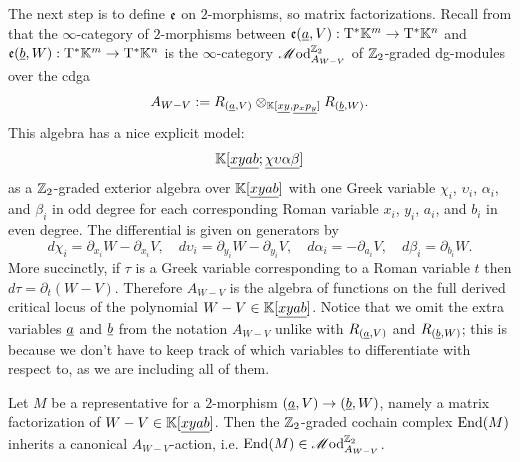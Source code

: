 The next step is to define $\mathfrak{e}$ on $2$-morphisms, so matrix factorizations. Recall from  that the $\infty$-category of $2$-morphisms between $\mathfrak{e}(\underline{a}, V) : \mathrm{T}^\ast \mathbb{K}^m \to \mathrm{T}^\ast \mathbb{K}^n$ and $\mathfrak{e}(\underline{b}, W) : \mathrm{T}^\ast \mathbb{K}^m \to \mathrm{T}^\ast \mathbb{K}^n$ is the $\infty$-category $\mathscr{M}\mathrm{od}^{\mathbb{Z}_2}_{A_{W - V}}$ of $\mathbb{Z}_2$-graded dg-modules over the cdga 
\begin{equation*}
	A_{W-V} := R_{(\underline{a}, V)} \otimes_{\mathbb{K}[\underline{xy}, \underline{p_x p_y}]} R_{(\underline{b}, W)}.
\end{equation*}
This algebra has a nice explicit model: 
\begin{equation*}
	\mathbb{K}[\underline{xyab}; \underline{\chi \upsilon \alpha \beta}]
\end{equation*}
as a $\mathbb{Z}_2$-graded exterior algebra over $\mathbb{K}[\underline{xyab}]$ with one Greek variable $\chi_i$, $\upsilon_i$, $\alpha_i$, and $\beta_i$ in odd degree for each corresponding Roman variable $x_i$, $y_i$, $a_i$, and $b_i$ in even degree. The differential is given on generators by
\begin{equation*}
	d\chi_i = \partial_{x_i} W - \partial_{x_i} V, \quad d \upsilon_i = \partial_{y_i} W - \partial_{y_i} V, \quad d \alpha_i = - \partial_{a_i} V, \quad d\beta_i = \partial_{b_i} W.
\end{equation*}
More succinctly, if $\tau$ is a Greek variable corresponding to a Roman variable $t$ then $d\tau = \partial_t (W - V)$. Therefore $A_{W - V}$ is the algebra of functions on the full derived critical locus of the polynomial $W - V \in \mathbb{K}[\underline{xyab}]$. Notice that we omit the extra variables $\underline{a}$ and $\underline{b}$ from the notation $A_{W - V}$ unlike with $R_{(\underline{a}, V)}$ and $R_{(\underline{b}, W)}$; this is because we don't have to keep track of which variables to differentiate with respect to, as we are including all of them.

\begin{prp} \label{prp:end-is-module}
	Let $M$ be a representative for a $2$-morphism $(\underline{a}, V) \to (\underline{b}, W)$, namely a matrix factorization of $W - V \in \mathbb{K}[\underline{xyab}]$. Then the $\mathbb{Z}_2$-graded cochain complex $\mathrm{End}(M)$ inherits a canonical $A_{W - V}$-action, i.e. $\mathrm{End}(M) \in \mathscr{M}\mathrm{od}_{A_{W - V}}^{\mathbb{Z}_2}$.
\end{prp}

